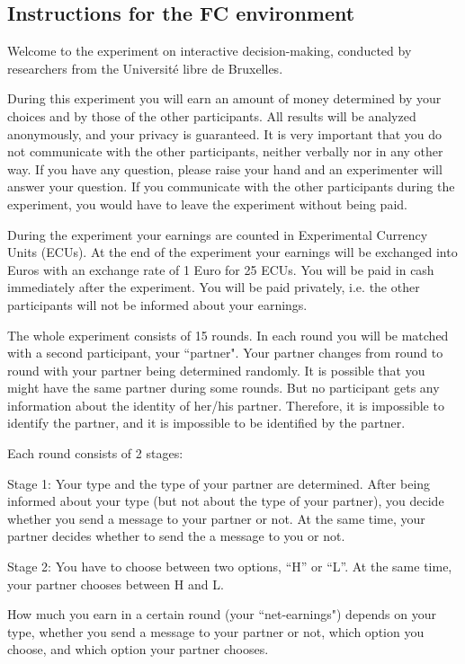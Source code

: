 \documentclass[12pt]{article}
\theoremstyle{break}
\begin{document}
\subsection{Instructions for the FC environment}

Welcome to the experiment on interactive decision-making, conducted by researchers from the Université libre de Bruxelles.

During this experiment you will earn an amount of money determined by your choices and by those of the other participants. All results will be analyzed anonymously, and your privacy is guaranteed. It is very important that you do not communicate with the other participants, neither verbally nor in any other way. If you have any question, please raise your hand and an experimenter will answer your question. If you communicate with the other participants during the experiment, you would have to leave the experiment without being paid. 

During the experiment your earnings are counted in Experimental Currency Units (ECUs). At the end of the experiment your earnings will be exchanged into Euros with an exchange rate of 1 Euro for 25 ECUs. You will be paid in cash immediately after the experiment. You will be paid privately, i.e. the other participants will not be informed about your earnings.

The whole experiment consists of 15 rounds. In each round you will be matched with a second participant, your ``partner". Your partner changes from round to round with your partner being determined randomly. It is possible that you might have the same partner during some rounds. But no participant gets any information about the identity of her/his partner. Therefore, it is impossible to identify the partner, and it is impossible to be identified by the partner.

Each round consists of 2 stages:

Stage 1: Your type and the type of your partner are determined. After being informed about your type (but not about the type of your partner), you decide whether you send a message to your partner or not. At the same time, your partner decides whether to send the a message to you or not.

Stage 2: You have to choose between two options, “H” or “L”. At the same time, your partner chooses between H and L. 

How much you earn in a certain round (your ``net-earnings") depends on your type, whether you send a message to your partner or not, which option you choose, and which option your partner chooses. 
\end{document}
